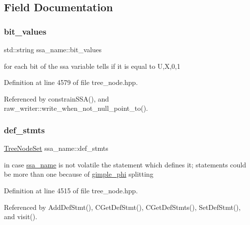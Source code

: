 \subsection{Field Documentation}
\mbox{\label{structssa__name_a1e95b78cc7c668cba5f3472c78e44f66}} 
\subsubsection{\texorpdfstring{bit\+\_\+values}{bit\_values}}
{\footnotesize\ttfamily std\+::string ssa\+\_\+name\+::bit\+\_\+values}



for each bit of the ssa variable tells if it is equal to U,X,0,1 



Definition at line 4579 of file tree\+\_\+node.\+hpp.



Referenced by constrain\+S\+S\+A(), and raw\+\_\+writer\+::write\+\_\+when\+\_\+not\+\_\+null\+\_\+point\+\_\+to().

\mbox{\label{structssa__name_a21e52d768d609913c6b0db67d9882445}} 
\subsubsection{\texorpdfstring{def\+\_\+stmts}{def\_stmts}}
{\footnotesize\ttfamily \hyperlink{classTreeNodeSet}{Tree\+Node\+Set} ssa\+\_\+name\+::def\+\_\+stmts\hspace{0.3cm}{\ttfamily [private]}}



in case \hyperlink{structssa__name}{ssa\+\_\+name} is not volatile the statement which defines it; statements could be more than one because of \hyperlink{structgimple__phi}{gimple\+\_\+phi} splitting 



Definition at line 4515 of file tree\+\_\+node.\+hpp.



Referenced by Add\+Def\+Stmt(), C\+Get\+Def\+Stmt(), C\+Get\+Def\+Stmts(), Set\+Def\+Stmt(), and visit().

